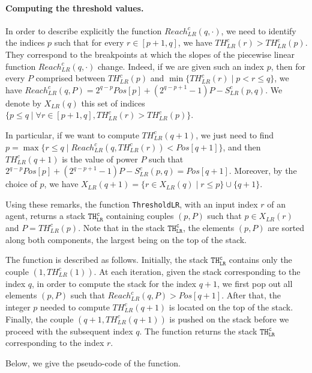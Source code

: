 \documentclass{article}
\newcommand\rclr{Reach_{LR}^c\xspace}
\newcommand\tclr{TH_{LR}^c\xspace}
\newcommand\sclr{S_{LR}^c\xspace}
\newcommand\CompThLR{\mbox{{\tt ThresholdLR}}\xspace}
\begin{document}
\paragraph{Computing the threshold values.}

In order to describe explicitly the function $\rclr(q,\cdot)$,
we need to identify the indices $p$ such that for every $r\in
[p+1,q]$, we have $\tclr(r) > \tclr(p)$. They correspond to the
breakpoints at which the slopes of the piecewise linear function
$\rclr(q,\cdot)$ change. Indeed, if we are given such an index
$p$, then for every $P$ comprised between $\tclr(p)$ and $\min
\{\tclr(r) \mid p< r \leq q \}$, we have $\rclr(q,P) =
2^{q-p}Pos[p] + (2^{q-p+1}-1)P - \sclr(p,q)$. We denote by
$X_{LR}(q)$ this set of indices $\{p \leq q \mid \forall r \in
[p+1,q] , \tclr(r) > \tclr(p)\}$.

In particular, if we want to compute $\tclr(q+1)$, we just need to
find $p = \max\{r \leq q \mid \rclr(q, \tclr(r)) < Pos[q+1]\}$,
and then $\tclr(q+1)$ is the value of power $P$ such that
$2^{q-p}Pos[p] + (2^{q-p+1}-1)P - \sclr(p,q) = Pos[q+1]$.  Moreover,
by the choice of $p$, we have $X_{LR}(q+1) = \{r \in X_{LR}(q) \mid r \leq p\}
\cup \{q+1\}$.

Using these remarks, the function \CompThLR, with an input index $r$ of an agent, returns a stack $\mathtt{\tclr}$ containing
couples $(p,P)$ such that $p \in X_{LR}(r)$ and $P= \tclr(p)$.  
Note that in the stack $\mathtt{\tclr}$, the elements $(p,P)$ are sorted
along both components, the largest being on the top of the stack.

The function is described as follows.  Initially, the stack
$\mathtt{\tclr}$ contains only the couple $(1, \tclr(1))$.  At
each iteration, given the stack corresponding to the index $q$, in
order to compute the stack for the index $q+1$, we first pop out all
elements $(p,P)$ such that $\rclr(q,P) > Pos[q+1]$. After that,
the integer $p$ needed to compute $\tclr(q+1)$ is located on the top
of the stack.  Finally, the couple $(q+1,\tclr(q+1))$ is pushed on
the stack before we proceed with the subsequent index $q.$
 The function returns the stack $\mathtt{\tclr}$ corresponding
to the index $r$.

Below, we give the pseudo-code of the function.
\end{document}
